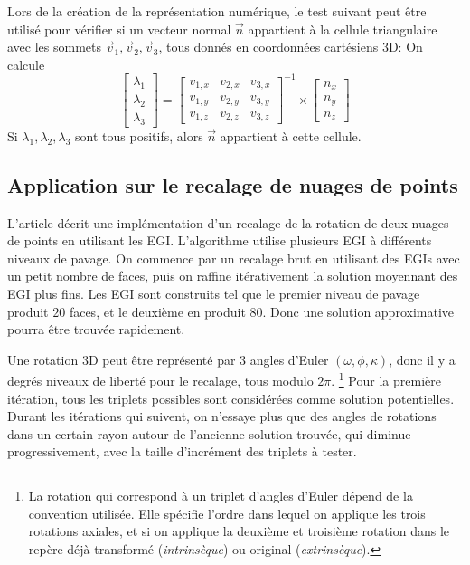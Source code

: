 \documentclass[a4paper,10pt]{scrreprt}
\begin{document}
Lors de la création de la représentation numérique, le test suivant peut être utilisé pour vérifier si un vecteur normal $\vec{n}$ appartient à la cellule triangulaire avec les sommets $\vec{v}_1, \vec{v}_2, \vec{v}_3$, tous donnés en coordonnées cartésiens 3D: On calcule
\begin{equation*}
	\begin{bmatrix}
		\lambda_1 \\ \lambda_2 \\ \lambda_3
	\end{bmatrix} = \begin{bmatrix}
		v_{1,x} & v_{2,x} & v_{3,x} \\
		v_{1,y} & v_{2,y} & v_{3,y} \\
		v_{1,z} & v_{2,z} & v_{3,z}
	\end{bmatrix}^{-1} \times \begin{bmatrix}
		n_x \\ n_y \\ n_z
	\end{bmatrix}
\end{equation*}
Si $\lambda_1, \lambda_2, \lambda_3$ sont tous positifs, alors $\vec{n}$ appartient à cette cellule.


\subsection{Application sur le recalage de nuages de points}
L'article \cite{Dold2005} décrit une implémentation d'un recalage de la rotation de deux nuages de points en utilisant les EGI. L'algorithme utilise plusieurs EGI à différents niveaux de pavage. On commence par un recalage brut en utilisant des EGIs avec un petit nombre de faces, puis on raffine itérativement la solution moyennant des EGI plus fins. Les EGI sont construits tel que le premier niveau de pavage produit $20$ faces, et le deuxième en produit $80$. Donc une solution approximative pourra être trouvée rapidement.

Une rotation 3D peut être représenté par 3 angles d'Euler $(\omega, \phi, \kappa)$, donc il y a degrés niveaux de liberté pour le recalage, tous modulo $2 \pi$.
\footnote{La rotation qui correspond à un triplet d'angles d'Euler dépend de la convention utilisée. Elle spécifie l'ordre dans lequel on applique les trois rotations axiales, et si on applique la deuxième et troisième rotation dans le repère déjà transformé (\emph{intrinsèque}) ou original (\emph{extrinsèque}).}
Pour la première itération, tous les triplets possibles sont considérées comme solution potentielles. Durant les itérations qui suivent, on n'essaye plus que des angles de rotations dans un certain rayon autour de l'ancienne solution trouvée, qui diminue progressivement, avec la taille d'incrément des triplets à tester.
\end{document}
